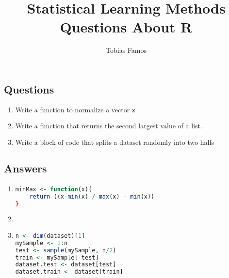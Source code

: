 \documentclass[11pt]{article}
\title{Statistical Learning Methods \\ Questions About R}
\author{Tobias Famos}
\begin{document}
    \maketitle
    \subsection*{Questions}
    \begin{enumerate}
        \item Write a function to normalize a vector \texttt{x}
        \item Write a function that returns the second largest value of a list.
        \item Write a block of code that splits a dataset randomly into two halfs
    \end{enumerate}
    \newpage
    \subsection*{Answers}
    \begin{enumerate}
        \item \begin{lstlisting}[language=R]
minMax <- function(x){
    return ((x-min(x) / max(x) - min(x))
}
        \end{lstlisting}
        \item
        \item \begin{lstlisting}[language=R]
n <- dim(dataset)[1]
mySample <- 1:n
test <- sample(mySample, n/2)
train <- mySample[-test]
dataset.test <- dataset[test]
dataset.train <- dataset[train]

        \end{lstlisting}
    \end{enumerate}
\end{document}
